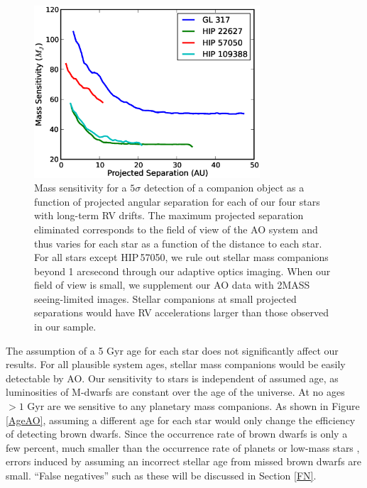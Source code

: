 \begin{figure}[htbp]
\centerline{\includegraphics[width=0.75\textwidth]{chapter3/f7.eps}}
\caption[Mass sensitivity for a $5\sigma$ AO detection of a companion
as a function of projected angular separation]{Mass sensitivity for a $5\sigma$ detection of a companion object as a function of projected angular separation for each of our four stars with long-term RV drifts. The maximum projected separation eliminated corresponds to the field of view of the AO system and thus varies for each star as a function of the distance to each star. For all stars except HIP\,57050, we rule out stellar mass companions beyond 1 arcsecond through our adaptive optics imaging. When our field of view is small, we supplement our AO data with 2MASS seeing-limited images. Stellar companions at small projected separations would have RV accelerations larger than those observed in our sample. 
  }
\label{CCplot}
\end{figure}

The assumption of a 5 Gyr age for each star does not significantly affect our results. For all plausible system ages, stellar mass companions would be easily detectable by AO. Our sensitivity to stars is independent of assumed age, as luminosities of M-dwarfs are constant over the age of the universe. At no ages $> 1$ Gyr are we sensitive to any planetary mass companions. As shown in Figure \ref{AgeAO}, assuming a different age for each star would only change the efficiency of detecting brown dwarfs. Since the occurrence rate of brown dwarfs is only a few percent, much smaller than the occurrence rate of planets or low-mass stars \citep{Metchev09, Dieterich12}, errors induced by assuming an incorrect stellar age from missed brown dwarfs are small. ``False negatives'' such as these will be discussed in Section \ref{FN}.

